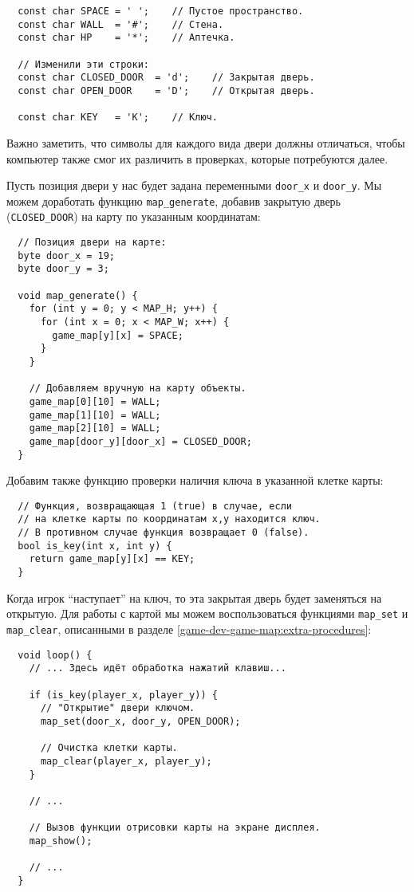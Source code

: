 \documentclass[../sparc.tex]{subfiles}
\begin{document}
\begin{verbatim}
  const char SPACE = ' ';    // Пустое пространство.
  const char WALL  = '#';    // Стена.
  const char HP    = '*';    // Аптечка.

  // Изменили эти строки:
  const char CLOSED_DOOR  = 'd';    // Закрытая дверь.
  const char OPEN_DOOR    = 'D';    // Открытая дверь.

  const char KEY   = 'K';    // Ключ.
\end{verbatim}

Важно заметить, что символы для каждого вида двери должны отличаться, чтобы
компьютер также смог их различить в проверках, которые потребуются далее.

Пусть позиция двери у нас будет задана переменными \texttt{door\_x} и
\texttt{door\_y}.  Мы можем доработать функцию \texttt{map\_generate}, добавив
закрытую дверь (\texttt{CLOSED\_DOOR}) на карту по указанным координатам:

\begin{verbatim}
  // Позиция двери на карте:
  byte door_x = 19;
  byte door_y = 3;

  void map_generate() {
    for (int y = 0; y < MAP_H; y++) {
      for (int x = 0; x < MAP_W; x++) {
        game_map[y][x] = SPACE;
      }
    }

    // Добавляем вручную на карту объекты.
    game_map[0][10] = WALL;
    game_map[1][10] = WALL;
    game_map[2][10] = WALL;
    game_map[door_y][door_x] = CLOSED_DOOR;
  }
\end{verbatim}

Добавим также функцию проверки наличия ключа в указанной клетке карты:

\begin{verbatim}
  // Функция, возвращающая 1 (true) в случае, если
  // на клетке карты по координатам x,y находится ключ.
  // В противном случае функция возвращает 0 (false).
  bool is_key(int x, int y) {
    return game_map[y][x] == KEY;
  }
\end{verbatim}

Когда игрок ``наступает'' на ключ, то эта закрытая дверь будет заменяться на
открытую.  Для работы с картой мы можем воспользоваться функциями
\texttt{map\_set} и \texttt{map\_clear}, описанными в разделе
\ref{game-dev-game-map:extra-procedures}:

\begin{verbatim}
  void loop() {
    // ... Здесь идёт обработка нажатий клавиш...

    if (is_key(player_x, player_y)) {
      // "Открытие" двери ключом.
      map_set(door_x, door_y, OPEN_DOOR);

      // Очистка клетки карты.
      map_clear(player_x, player_y);
    }

    // ...

    // Вызов функции отрисовки карты на экране дисплея.
    map_show();

    // ...
  }
\end{verbatim}
\end{document}
